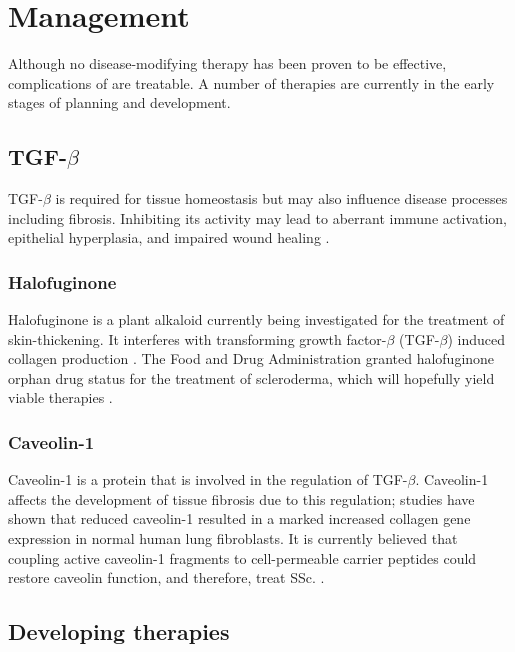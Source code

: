 \section{Management}
\label{management}

Although no disease-modifying therapy has been proven to be effective,
complications of \ssc are treatable. A number of therapies are currently in
the early stages of planning and development.

\subsection{TGF-$\beta$}

TGF-$\beta$ is required for tissue homeostasis but may also influence disease
processes including fibrosis. Inhibiting its activity may lead to aberrant
immune activation, epithelial hyperplasia, and impaired wound healing
\citep{antiTGFbeta}.

\subsubsection{Halofuginone}

Halofuginone is a plant alkaloid currently being investigated for the
treatment of skin-thickening. It interferes with transforming growth
factor-$\beta$ (TGF-$\beta$) induced collagen production
\citep{overviewTreatment}. The Food and Drug Administration granted
halofuginone orphan drug status for the treatment of scleroderma, which will
hopefully yield viable therapies \citep{halofuginone}.

\subsubsection{Caveolin-1}

Caveolin-1 is a protein that is involved in the regulation of TGF-$\beta$.
Caveolin-1 affects the development of tissue fibrosis due to this regulation;
studies have shown that reduced caveolin-1 resulted in a marked increased
collagen gene expression in normal human lung fibroblasts. It is currently
believed that coupling active caveolin-1 fragments to cell-permeable carrier
peptides could restore caveolin function, and therefore, treat SSc.
\citep{delgaldo}.

\subsection{Developing therapies}

